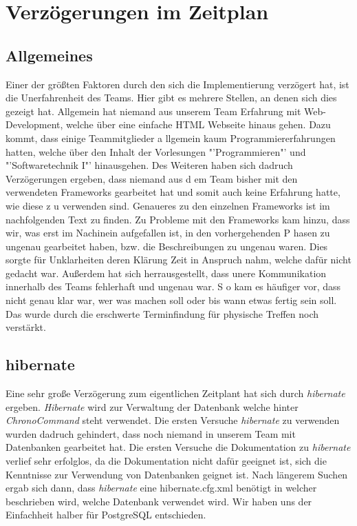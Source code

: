 \section{Verzögerungen im Zeitplan}
\subsection{Allgemeines}
Einer der größten Faktoren durch den sich die Implementierung verzögert hat, ist die Unerfahrenheit des Teams. 
Hier gibt es mehrere Stellen, an denen sich dies gezeigt hat. Allgemein hat niemand aus unserem Team Erfahrung 
mit Web-Development, welche über eine einfache HTML Webseite hinaus gehen. Dazu kommt, dass einige Teammitglieder a
llgemein kaum Programmiererfahrungen hatten, welche über den Inhalt der Vorlesungen "'Programmieren"' und 
"'Softwaretechnik I"' hinausgehen. Des Weiteren haben sich dadruch Verzögerungen ergeben, dass niemand aus d
em Team bisher mit den verwendeten Frameworks gearbeitet hat und somit auch keine Erfahrung hatte, wie diese z
u verwenden sind. Genaueres zu den einzelnen Frameworks ist im nachfolgenden Text zu finden. 
Zu Probleme mit den Frameworks kam hinzu, dass wir, was erst im Nachinein aufgefallen ist, in den vorhergehenden P
hasen zu ungenau gearbeitet haben, bzw. die Beschreibungen zu ungenau waren. Dies sorgte für Unklarheiten deren 
Klärung Zeit in Anspruch nahm, welche dafür nicht gedacht war.
Außerdem hat sich herrausgestellt, dass unere Kommunikation innerhalb des Teams fehlerhaft und ungenau war. S
o kam es häufiger vor, dass nicht genau klar war, wer was machen soll oder bis wann etwas fertig sein soll. 
Das wurde durch die erschwerte Terminfindung für physische Treffen noch verstärkt. 





\subsection{hibernate}
Eine sehr große Verzögerung zum eigentlichen Zeitplant hat sich durch \emph{hibernate} ergeben. \emph{Hibernate} wird zur Verwaltung der
Datenbank welche hinter \emph{ChronoCommand} steht verwendet. Die ersten Versuche \emph{hibernate} zu verwenden wurden dadruch
gehindert, dass noch niemand in unserem Team mit Datenbanken gearbeitet hat. Die ersten Versuche die Dokumentation zu 
\emph{hibernate} verlief sehr erfolglos, da die Dokumentation nicht dafür geeignet ist, sich die Kenntnisse zur Verwendung von
Datenbanken geignet ist. Nach längerem Suchen ergab sich dann, dass \emph{hibernate} eine hibernate.cfg.xml benötigt in welcher 
beschrieben wird, welche Datenbank verwendet wird. Wir haben uns der Einfachheit halber für PostgreSQL entschieden. 


